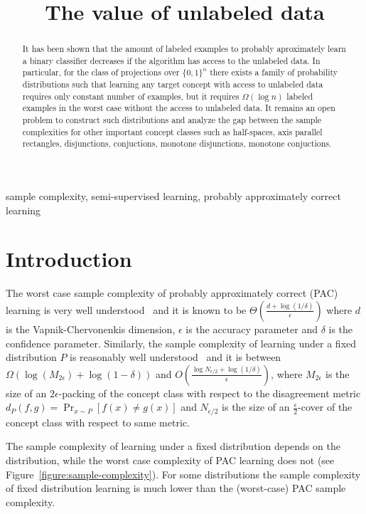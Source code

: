 \documentclass[12pt]{colt2019}
\title{The value of unlabeled data}
\begin{document}
\maketitle

\begin{abstract}
It has been shown that the amount of labeled examples to probably aproximately
learn a binary classifier decreases if the algorithm has access to the unlabeled
data. In particular, for the class of projections over $\{0,1\}^n$ there exists
a family of probability distributions such that learning any target concept with
access to unlabeled data requires only constant number of examples, but it
requires $\Omega(\log n)$ labeled examples in the worst case without the access
to unlabeled data. It remains an open problem to construct such distributions
and analyze the gap between the sample complexities for other important concept
classes such as half-spaces, axis parallel rectangles, disjunctions,
conjuctions, monotone disjunctions, monotone conjuctions.
\end{abstract}

\begin{keywords}
sample complexity, semi-supervised learning, probably approximately correct
learning
\end{keywords}

\section{Introduction}

The worst case sample complexity of probably approximately correct (PAC)
learning is very well understood~\citep{Hanneke-2016} and it is known to be
$\Theta \left(\frac{d + \log(1/\delta)}{\epsilon}\right)$ where $d$ is the
Vapnik-Chervonenkis dimension, $\epsilon$ is the accuracy parameter and $\delta$
is the confidence parameter. Similarly, the sample complexity of learning under
a fixed distribution $P$ is reasonably well understood~\citep{Benedek-Itai-1991}
and it is between $\Omega(\log(M_{2\epsilon}) + \log(1-\delta))$ and $O
\left(\frac{\log N_{\epsilon/2} + \log(1/\delta)}{\epsilon} \right)$, where
$M_{2\epsilon}$ is the size of an $2\epsilon$-packing of the concept class with
respect to the disagreement metric $d_P(f,g) = \Pr_{x \sim P}[f(x) \neq g(x)]$
and $N_{\epsilon/2}$ is the size of an $\frac{\epsilon}{2}$-cover of the concept
class with respect to same metric.

The sample complexity of learning under a fixed distribution depends on the
distribution, while the worst case complexity of PAC learning does not (see
Figure~\ref{figure:sample-complexity}). For some distributions the sample
complexity of fixed distribution learning is much lower than the (worst-case)
PAC sample complexity.
\end{document}
